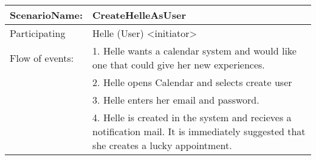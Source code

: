{\tabulinesep=1.2mm
\begin{tabu}{ | p{3cm} | p{13cm} |}
    \hline
    ScenarioName: 			& 		CreateHelleAsUser\\ \hline
    Participating 			& 		Helle (User) <initiator> \\	\hline
    Flow of events: 		& 		1. Helle wants a calendar system and would like one that could give her new experiences. \\
							&		2. Helle opens Calendar and selects create user\\
							&		3. Helle enters her email and password.\\
							&		4. Helle is created in the system and recieves a notification mail. It is immediately suggested that she creates a lucky appointment.\\\hline
\end{tabu}
}
